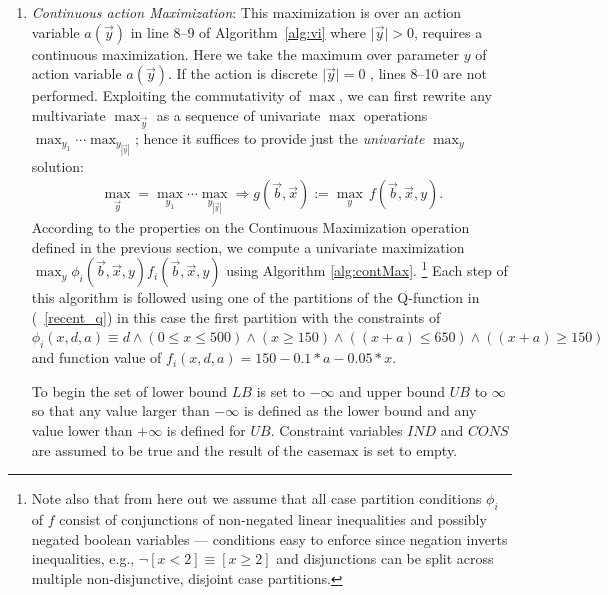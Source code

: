 \documentclass[twoside,11pt]{article}
\newcommand{\casemax}{\mathrm{casemax}}
\newcommand{\UB}{\mathit{UB}}
\newcommand{\LB}{\mathit{LB}}
\begin{document}
\begin{enumerate}
\begin{algorithm}[t!]
{      \;
}
\caption{\footnotesize \texttt{Continuous Maximization}($y$, $f(\vec{b},\vec{x},y)$) $\longrightarrow(max_{y}f(\vec{b},\vec{x},y))$ \label{alg:contMax}}
\vspace{-1mm}
\end{algorithm}
\decmargin{.5em}
\item {\it Continuous action Maximization}: This maximization is over an action variable $a(\vec{y})$ in line 8--9 of
Algorithm~\ref{alg:vi} where $\mid \vec{y} \mid>0$, requires a continuous maximization. Here we take the maximum over parameter $y$ of action variable $a(\vec{y})$. If the action is discrete $\mid \vec{y} \mid=0$ , lines 8--10 are not performed.
Exploiting the commutativity of $\max$, we can first
rewrite any multivariate $\max_{\vec{y}}$ as a sequence of univariate
$\max$ operations $\max_{y_1} \cdots \max_{y_{|\vec{y}|}}$; hence it
suffices to provide just the \emph{univariate} $\max_y$ solution:
\begin{align}
\max_{\vec{y}} =\max_{y_1} \cdots \max_{y_{|\vec{y}|}} \Rightarrow g(\vec{b},\vec{x}) := \max_{y} \, f(\vec{b},\vec{x},y). \nonumber
\end{align}
According to the properties on the Continuous Maximization operation defined in the previous section, we compute a univariate maximization  
$\max_y \phi_i(\vec{b},\vec{x},y) f_i(\vec{b},\vec{x},y)$ using Algorithm \ref{alg:contMax}. 
\footnote{Note also that from here out we assume that all case partition conditions $\phi_i$ of
$f$ consist of conjunctions of non-negated linear inequalities and
possibly negated boolean variables --- conditions easy to enforce
since negation inverts inequalities, e.g., $\neg [x < 2] \equiv [x \geq 2]$
and disjunctions can be split across multiple non-disjunctive, 
disjoint case partitions.} 
Each step of this algorithm is followed using one of the partitions of the Q-function in (~\ref{recent_q}) in this case the first partition with the constraints of 
$\phi_i(x,d,a) \equiv d \land (0 \leq x \leq 500) \land (x \geq 150) \land ((x+a) \leq 650) \land ((x+a) \geq 150) $ and function value of $ f_i(x,d,a) = 150 - 0.1 * a - 0.05 * x$.

To begin the set of lower bound $\LB$ is set to $-\infty$ and upper bound $\UB$ to $\infty$ so that any value larger than $-\infty$ is defined as the lower bound and any value lower than $+\infty$ is defined for $\UB$. Constraint variables $IND$ and $CONS$ are assumed to be true and the result of the $\casemax$ is set to empty. 


\end{enumerate}
\end{document}
